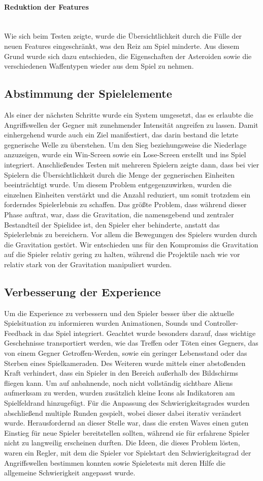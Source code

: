 \documentclass[11pt]{scrartcl}
\newcommand{\lbparagraph}[1]{\paragraph*{#1}\mbox{}\\}
\begin{document}
\lbparagraph{Reduktion der Features}
Wie sich beim Testen zeigte, wurde die Übersichtlichkeit durch die Fülle der neuen Features eingeschränkt, was den Reiz am Spiel minderte. Aus diesem Grund wurde sich dazu entschieden, die Eigenschaften der Asteroiden sowie die verschiedenen Waffentypen wieder aus dem Spiel zu nehmen.

\subsection{Abstimmung der Spielelemente}
Als einer der nächsten Schritte wurde ein System umgesetzt, das es erlaubte die Angriffswellen der Gegner mit zunehmender Intensität angreifen zu lassen. Damit einhergehend wurde auch ein Ziel manifestiert, das darin bestand die letzte gegnerische Welle zu überstehen. Um den Sieg beziehungsweise die Niederlage anzuzeigen, wurde ein Win-Screen sowie ein Lose-Screen erstellt und ins Spiel integriert.
Anschließendes Testen mit mehreren Spielern zeigte dann, dass bei vier Spielern die Übersichtlichkeit durch die Menge der gegnerischen Einheiten beeinträchtigt wurde. Um diesem Problem entgegenzuwirken, wurden die einzelnen Einheiten verstärkt und die Anzahl reduziert, um somit trotzdem ein forderndes Spielerlebnis zu schaffen.
Das größte Problem, dass während dieser Phase auftrat, war, dass die Gravitation, die namensgebend und zentraler Bestandteil der Spielidee ist, den Spieler eher behinderte, anstatt das Spielerlebnis zu bereichern. Vor allem die Bewegungen des Spielers wurden durch die Gravitation gestört. Wir entschieden uns für den Kompromiss die Gravitation auf die Spieler relativ gering zu halten, während die Projektile nach wie vor relativ stark von der Gravitation manipuliert wurden.

\subsection{Verbesserung der Experience}
Um die Experience zu verbessern und den Spieler besser über die aktuelle Spielsituation zu informieren wurden Animationen, Sounds und Controller-Feedback in das Spiel integriert. Geachtet wurde besonders darauf, dass wichtige Geschehnisse transportiert werden, wie das Treffen oder Töten eines Gegners, das von einem Gegner Getroffen-Werden, sowie ein geringer Lebensstand oder das Sterben eines Spielkameraden. Des Weiteren wurde mittels einer abstoßenden Kraft verhindert, dass ein Spieler in den Bereich außerhalb des Bildschirms fliegen kann. Um auf anbahnende, noch nicht vollständig sichtbare Aliens aufmerksam zu werden, wurden zusätzlich kleine Icons als Indikatoren am Spielfeldrand hinzugefügt.
Für die Anpassung des Schwierigkeitsgrades wurden abschließend multiple Runden gespielt, wobei dieser dabei iterativ verändert wurde. Herausfordernd an dieser Stelle war, dass die ersten Waves einen guten Einstieg für neue Spieler bereitstellen sollten, während sie für erfahrene Spieler nicht zu langweilig erscheinen durften. Die Ideen, die dieses Problem lösten, waren ein Regler, mit dem die Spieler vor Spielstart den Schwierigkeitsgrad der Angriffswellen bestimmen konnten sowie Spieletests mit deren Hilfe die allgemeine Schwierigkeit angepasst wurde.
\end{document}
